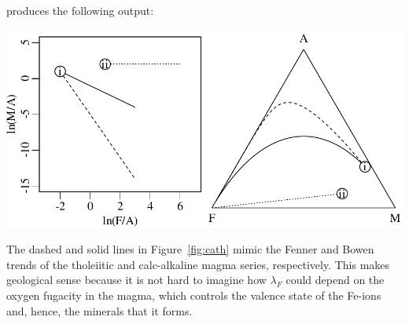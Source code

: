 \noindent produces the following output:

\noindent\begin{minipage}[t][][b]{.7\textwidth}
\includegraphics[width=\textwidth]{../figures/cath.pdf}\\
\end{minipage}
\begin{minipage}[t][][t]{.3\textwidth}
  \label{fig:cath}
\end{minipage}

The dashed and solid lines in Figure~\ref{fig:cath} mimic the Fenner
and Bowen trends of the tholeiitic and calc-alkaline magma series,
respectively. This makes geological sense because it is not hard to
imagine how $\lambda_F$ could depend on the oxygen fugacity in the
magma, which controls the valence state of the Fe-ions and, hence, the
minerals that it forms.
